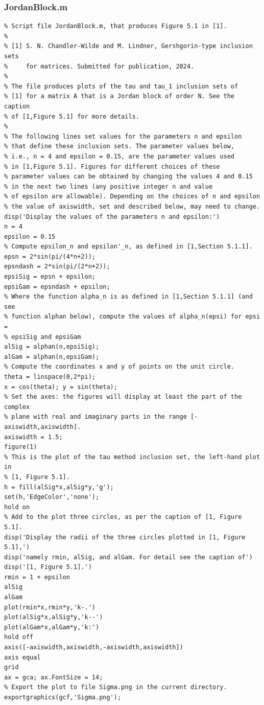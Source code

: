\documentclass[preprint,1p,11pt]{elsarticle}
\numberwithin{equation}{section}   %
\numberwithin{figure}{section}  %
\begin{document}
\subsubsection{JordanBlock.m} \label{code:JB}

\begin{verbatim}
% Script file JordanBlock.m, that produces Figure 5.1 in [1].
%
% [1] S. N. Chandler-Wilde and M. Lindner, Gershgorin-type inclusion sets
%     for matrices. Submitted for publication, 2024.
%
% The file produces plots of the tau and tau_1 inclusion sets of 
% [1] for a matrix A that is a Jordan block of order N. See the caption
% of [1,Figure 5.1] for more details.
%
% The following lines set values for the parameters n and epsilon
% that define these inclusion sets. The parameter values below, 
% i.e., n = 4 and epsilon = 0.15, are the parameter values used 
% in [1,Figure 5.1]. Figures for different choices of these 
% parameter values can be obtained by changing the values 4 and 0.15 
% in the next two lines (any positive integer n and value
% of epsilon are allowable). Depending on the choices of n and epsilon 
% the value of axiswidth, set and described below, may need to change.
disp('Display the values of the parameters n and epsilon:')
n = 4
epsilon = 0.15
% Compute epsilon_n and epsilon'_n, as defined in [1,Section 5.1.1].
epsn = 2*sin(pi/(4*n+2));
epsndash = 2*sin(pi/(2*n+2));
epsiSig = epsn + epsilon;
epsiGam = epsndash + epsilon;
% Where the function alpha_n is as defined in [1,Section 5.1.1] (and see
% function alphan below), compute the values of alpha_n(epsi) for epsi =
% epsiSig and epsiGam
alSig = alphan(n,epsiSig);
alGam = alphan(n,epsiGam);
% Compute the coordinates x and y of points on the unit circle.
theta = linspace(0,2*pi);
x = cos(theta); y = sin(theta);
% Set the axes: the figures will display at least the part of the complex
% plane with real and imaginary parts in the range [-axiswidth,axiswidth].
axiswidth = 1.5;
figure(1)
% This is the plot of the tau method inclusion set, the left-hand plot in
% [1, Figure 5.1].
h = fill(alSig*x,alSig*y,'g');
set(h,'EdgeColor','none');
hold on
% Add to the plot three circles, as per the caption of [1, Figure 5.1].
disp('Display the radii of the three circles plotted in [1, Figure 5.1],')
disp('namely rmin, alSig, and alGam. For detail see the caption of')
disp('[1, Figure 5.1].')
rmin = 1 + epsilon 
alSig
alGam
plot(rmin*x,rmin*y,'k-.')
plot(alSig*x,alSig*y,'k--')
plot(alGam*x,alGam*y,'k:')
hold off
axis([-axiswidth,axiswidth,-axiswidth,axiswidth])
axis equal
grid
ax = gca; ax.FontSize = 14;
% Export the plot to file Sigma.png in the current directory.
exportgraphics(gcf,'Sigma.png');


\end{verbatim}
\end{document}

